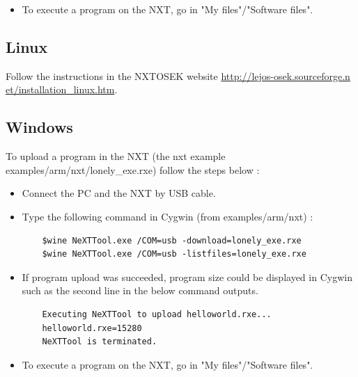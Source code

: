 \documentclass[10pt]{article}
\begin{document}
\begin{itemize}
\begin{center}[h]
	\end{center}
\item To execute a program on the NXT, go in "My files"/"Software files".
\end{itemize}

\subsection{Linux}
Follow the instructions in the NXTOSEK website \href{http://lejos-osek.sourceforge.net/installation_linux.htm}{http://lejos-osek.sourceforge.n et/installation\_linux.htm}.

\subsection{Windows}
To upload a program in the NXT (the nxt example examples/arm/nxt/lonely\_exe.rxe) follow the steps below :
\begin{itemize}
\item Connect the PC and the NXT by USB cable.
\item Type the following command in Cygwin (from examples/arm/nxt) :
	\begin{verbatim}
	$wine NeXTTool.exe /COM=usb -download=lonely_exe.rxe
	$wine NeXTTool.exe /COM=usb -listfiles=lonely_exe.rxe
	\end{verbatim}
\item If program upload was succeeded, program size could be displayed in Cygwin such as the second line in the below command outputs. 
	\begin{verbatim}
	Executing NeXTTool to upload helloworld.rxe...
	helloworld.rxe=15280
	NeXTTool is terminated.
	\end{verbatim}
\item To execute a program on the NXT, go in "My files"/"Software files".
\end{itemize}
\end{document}

